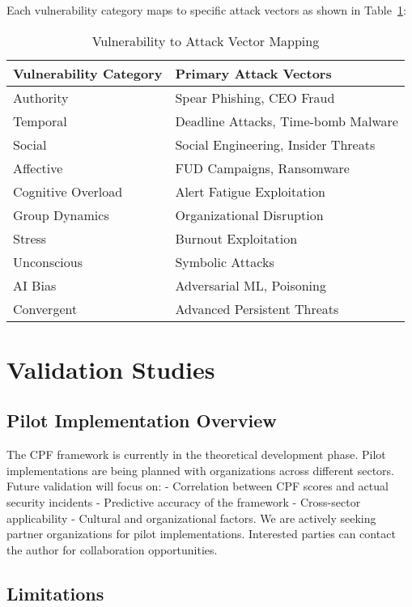 \documentclass[11pt,a4paper]{article}
\begin{document}
Each vulnerability category maps to specific attack vectors as shown in Table~\ref{tab:mapping}:

\begin{table}[ht!]
\centering
\caption{Vulnerability to Attack Vector Mapping}
\label{tab:mapping}
\begin{tabular}{ll}
\toprule
Vulnerability Category & Primary Attack Vectors \\
\midrule
Authority & Spear Phishing, CEO Fraud \\
Temporal & Deadline Attacks, Time-bomb Malware \\
Social & Social Engineering, Insider Threats \\
Affective & FUD Campaigns, Ransomware \\
Cognitive Overload & Alert Fatigue Exploitation \\
Group Dynamics & Organizational Disruption \\
Stress & Burnout Exploitation \\
Unconscious & Symbolic Attacks \\
AI Bias & Adversarial ML, Poisoning \\
Convergent & Advanced Persistent Threats \\
\bottomrule
\end{tabular}
\end{table}

\section{Validation Studies}

\subsection{Pilot Implementation Overview}

The CPF framework is currently in the theoretical development phase. Pilot implementations are being planned with organizations across different sectors. Future validation will focus on: - Correlation between CPF scores and actual security incidents - Predictive accuracy of the framework - Cross-sector applicability - Cultural and organizational factors. We are actively seeking partner organizations for pilot implementations. Interested parties can contact the author for collaboration opportunities.

\subsection{Limitations}
\end{document}
